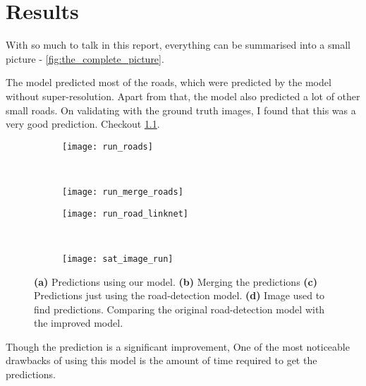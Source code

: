 \chapter{Results}\label{chapt:results}

With so much to talk in this report, everything can be summarised into a small picture - \cref{fig:the_complete_picture}.

The model predicted most of the roads, which were predicted by the model without super-resolution. Apart from that, the model also predicted a lot of other small roads. On validating with the ground truth images, I found that this was a very good prediction. Checkout \cref{fig:run_merge_road_maps}.

\begin{figure}[h!]
  \centering
  \begin{subfigure}{0.5\textwidth}
    \centering
    \texttt{[image: run\_roads]}
    \caption{}
  \end{subfigure}~
  \begin{subfigure}{0.5\textwidth}
    \centering
    \texttt{[image: run\_merge\_roads]}
    \caption{}
  \end{subfigure}
  \begin{subfigure}{0.5\textwidth}
    \centering
    \texttt{[image: run\_road\_linknet]}
    \caption{}
  \end{subfigure}~
  \begin{subfigure}{0.5\textwidth}
    \centering
    \texttt{[image: sat\_image\_run]}
    \caption{}
  \end{subfigure}
  \caption[Predictions]{\textbf{(a)} Predictions using our model. \textbf{(b)} Merging the predictions \textbf{(c)} Predictions just using the road-detection model. \textbf{(d)} Image used to find predictions. Comparing the original road-detection model with the improved model.}
  \label{fig:run_merge_road_maps}
\end{figure}


Though the prediction is a significant improvement, One of the most noticeable drawbacks of using this model is the amount of time required to get the predictions. 

